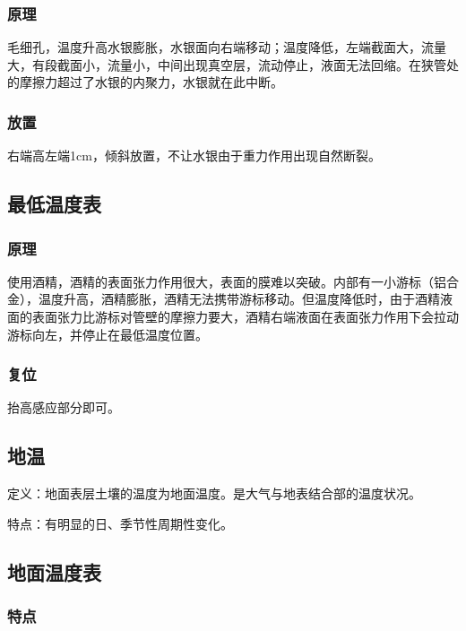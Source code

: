 \documentclass[UTF8,11pt]{ctexbook}
\begin{document}
\subsubsection{原理}

毛细孔，温度升高水银膨胀，水银面向右端移动；温度降低，左端截面大，流量大，有段截面小，流量小，中间出现真空层，流动停止，液面无法回缩。在狭管处的摩擦力超过了水银的内聚力，水银就在此中断。

\subsubsection{放置}

右端高左端1cm，倾斜放置，不让水银由于重力作用出现自然断裂。

\subsection{最低温度表}

\subsubsection{原理}

使用酒精，酒精的表面张力作用很大，表面的膜难以突破。内部有一小游标（铝合金），温度升高，酒精膨胀，酒精无法携带游标移动。但温度降低时，由于酒精液面的表面张力比游标对管壁的摩擦力要大，酒精右端液面在表面张力作用下会拉动游标向左，并停止在最低温度位置。


\subsubsection{复位}

抬高感应部分即可。

\subsection{地温}

定义：地面表层土壤的温度为地面温度。是大气与地表结合部的温度状况。

特点：有明显的日、季节性周期性变化。

\subsection{地面温度表}

\subsubsection{特点}
\end{document}
